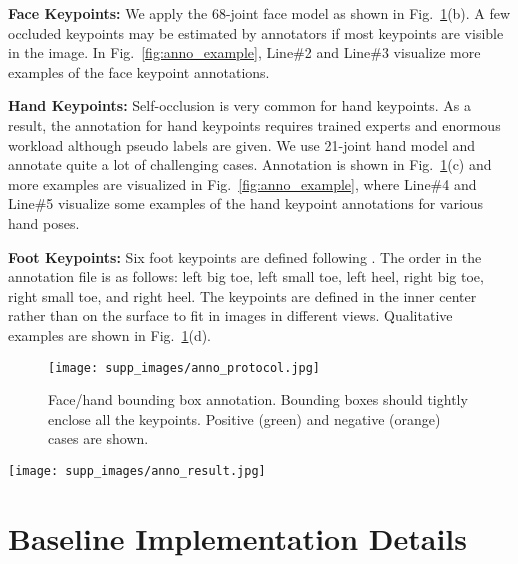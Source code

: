 \documentclass[runningheads]{llncs}
\newcommand{\ie}{\textit{i}.\textit{e}. }
\begin{document}
	\textbf{Face Keypoints:}
	We apply the 68-joint face model \cite{sagonas2013300} as shown in Fig.~\ref{fig:anno_box}(b). A few occluded keypoints may be estimated by annotators if most keypoints are visible in the image. In Fig.~\ref{fig:anno_example}, Line\#2 and Line\#3 visualize more examples of the face keypoint annotations.
	
	
	\textbf{Hand Keypoints:}
	Self-occlusion is very common for hand keypoints. As a result, the annotation for hand keypoints requires trained experts and enormous workload although pseudo labels are given. We use 21-joint hand model \cite{simon2017hand} and annotate quite a lot of challenging cases. Annotation is shown in Fig.~\ref{fig:anno_box}(c) and more examples are visualized in Fig.~\ref{fig:anno_example}, where Line\#4 and Line\#5 visualize some examples of the hand keypoint annotations for various hand poses.
	
	\textbf{Foot Keypoints:}
	Six foot keypoints are defined following \cite{cao2018openpose}. The order in the annotation file is as follows: left big toe, left small toe, left heel, right big toe, right small toe, and right heel. The keypoints are defined in the inner center rather than on the surface to fit in images in different views. Qualitative examples are shown in Fig.~\ref{fig:anno_box}(d).
	
	
	\begin{figure}[tb]
		\centering
		\texttt{[image: supp\_images/anno\_protocol.jpg]}
		\caption{Face/hand bounding box annotation. Bounding boxes should tightly enclose all the keypoints. Positive (green) and negative (orange) cases are shown.}
		\label{fig:anno_box}
	\end{figure}
	
	
	
	\begin{figure*}[tb]
		\centering
		\texttt{[image: supp\_images/anno\_result.jpg]}
		\caption{Annotation examples. Line \#1: We use different colors to distinguish different types of bounding boxes, \ie body (green), face (purple), left hand (blue) and right hand (red). Line \#2 and Line\#3: Face keypoints. Line \#4 and Line\#5: Hand keypoints.}
		\label{fig:anno_example}
	\end{figure*}
	
	
	\section{Baseline Implementation Details}
	
\end{document}
